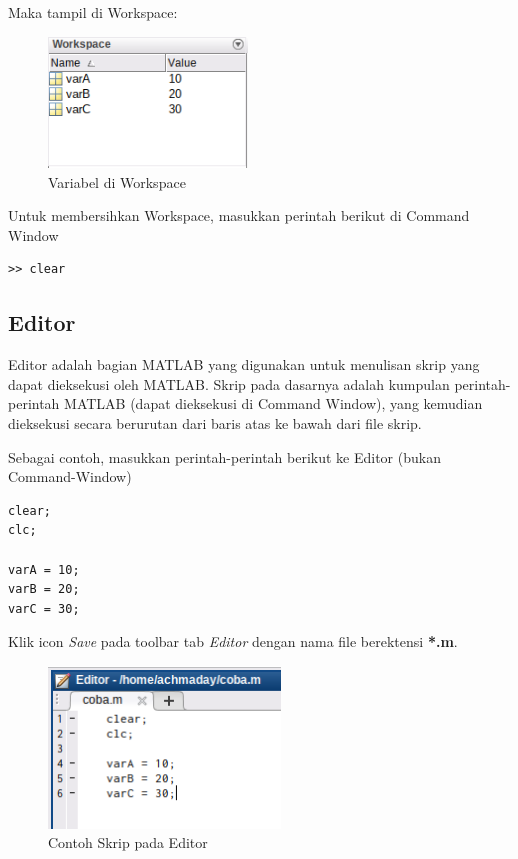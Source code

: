 \documentclass[12pt]{book}
\begin{document}
	\newpage
	Maka tampil di Workspace:

	\begin{figure}[!ht]
		\centering
		\includegraphics[width=150pt]{images/workspace}
		\caption{Variabel di Workspace}
	\end{figure}

	Untuk membersihkan Workspace, masukkan perintah berikut di Command Window
	\begin{verbatim}
>> clear
	\end{verbatim}

	\subsection{Editor}
	Editor adalah bagian MATLAB yang digunakan untuk menulisan skrip yang dapat dieksekusi oleh MATLAB.
	Skrip pada dasarnya adalah kumpulan perintah-perintah MATLAB (dapat dieksekusi di Command Window),
	yang kemudian dieksekusi secara berurutan dari baris atas ke bawah dari file skrip.

	Sebagai contoh, masukkan perintah-perintah berikut ke Editor (bukan Command-Window)
	\begin{verbatim}
clear;
clc;

varA = 10;
varB = 20;
varC = 30;
	\end{verbatim}

	Klik icon \textit{Save} pada toolbar tab \textit{Editor} dengan nama file berektensi \textbf{*.m}.

	\begin{figure}[!ht]
		\centering
		\includegraphics[width=175pt]{images/editorcoba}
		\caption{Contoh Skrip pada Editor}
	\end{figure}
\end{document}
